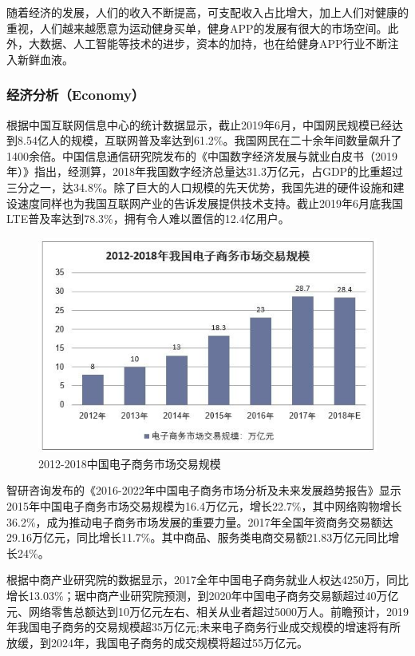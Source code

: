 \documentclass[UTF8,12pt]{ctexart}
\numberwithin{figure}{section}%
\begin{document}
\begin{spacing}{2}
随着经济的发展，人们的收入不断提高，可支配收入占比增大，加上人们对健康的重视，人们越来越愿意为运动健身买单，健身APP的发展有很大的市场空间。此外，大数据、人工智能等技术的进步，资本的加持，也在给健身APP行业不断注入新鲜血液。

\subsubsection{经济分析（Economy）}
根据中国互联网信息中心的统计数据显示，截止2019年6月，中国网民规模已经达到8.54亿人的规模，互联网普及率达到61.2\%。我国网民在二十余年间数量飙升了1400余倍。中国信息通信研究院发布的《中国数字经济发展与就业白皮书（2019年）》指出，经测算，2018年我国数字经济总量达31.3万亿元，占GDP的比重超过三分之一，达34.8\%。除了巨大的人口规模的先天优势，我国先进的硬件设施和建设速度同样也为我国互联网产业的告诉发展提供技术支持。截止2019年6月底我国LTE普及率达到78.3\%，拥有令人难以置信的12.4亿用户。

\begin{figure}[!htb]\label{5}
	\centering
	\includegraphics[width=12cm]{fig/5}
	\caption{2012-2018中国电子商务市场交易规模}
\end{figure}

智研咨询发布的《2016-2022年中国电子商务市场分析及未来发展趋势报告》显示2015年中国电子商务市场交易规模为16.4万亿元，增长22.7\%，其中网络购物增长36.2\%，成为推动电子商务市场发展的重要力量。2017年全国年资商务交易额达29.16万亿元，同比增长11.7\%。其中商品、服务类电商交易额21.83万亿元同比增长24\%。




根据中商产业研究院的数据显示，2017全年中国电子商务就业人权达4250万，同比增长13.03\%；琚中商产业研究院预测，到2020年中国电子商务交易额超过40万亿元、网络零售总额达到10万亿元左右、相关从业者超过5000万人。前瞻预计，2019年我国电子商务的交易规模超35万亿元;未来电子商务行业成交规模的增速将有所放缓，到2024年，我国电子商务的成交规模将超过55万亿元。


\end{spacing}
\end{document}
